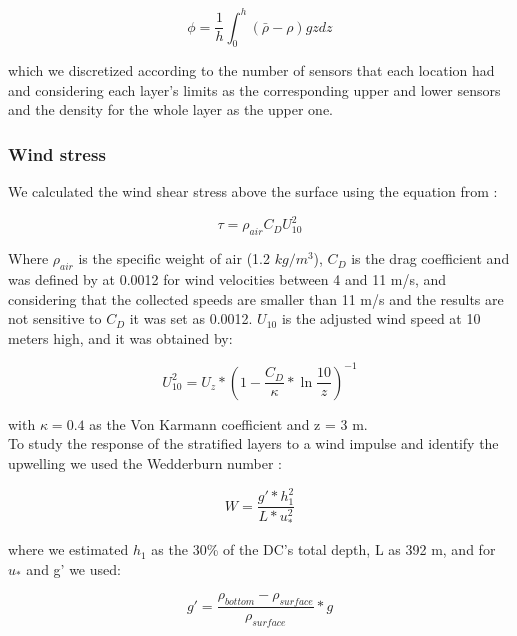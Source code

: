 \documentclass[tesis.tex]{subfiles}
\begin{document}
\begin{equation}
    \phi=\frac{1}{h}\int^h_0(\bar{\rho}-\rho)gzdz
    \label{eq: phi}
\end{equation}

which we discretized according to the number of sensors that each location had and considering each layer's limits as the corresponding upper and lower sensors and the density for the whole layer as the upper one. 

\subsubsection{Wind stress}

We calculated the wind shear stress above the surface using the equation from \cite{read2011derivation}: 

\begin{equation}
    \tau=\rho_{air} C_D U_{10}^2
    \label{eq: tau}
\end{equation}

Where $\rho_{air}$ is the specific weight of air (1.2 $kg/m^3$), $C_D$ is the drag coefficient and was defined by \cite{large1981open} at 0.0012 for wind velocities between 4 and 11 m/s, and considering that the collected speeds are smaller than 11 m/s and the results are not sensitive to $C_D$ it was set as 0.0012. $U_{10}$ is the adjusted wind speed at 10 meters high, and it was obtained by: 

\begin{equation}
    U_{10}^2=U_z*(1-\frac{C_D}{\kappa}*\ln{\frac{10}{z}})^{-1}
    \label{eq: adjvel}
\end{equation}

with $\kappa=0.4$ as the Von Karmann coefficient and z = 3 m.\\

To study the response of the stratified layers to a wind impulse and identify the upwelling we used the Wedderburn number \citep{Shintani2010}:

\begin{equation}
    W=\frac{g'*h_1^2}{L*u_*^2}
    \label{eq: wed}
\end{equation}

where we estimated $h_1$ as the 30\% of the DC's total depth, L as 392 m, and for $u_*$ and g' we used:

\begin{equation}
    g'=\frac{\rho_{bottom}-\rho_{surface}}{\rho_{surface}}*g
    \label{eq: redg}
\end{equation}
\end{document}
